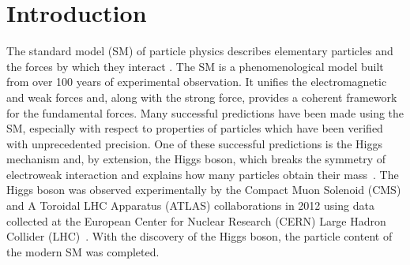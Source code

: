 \chapter{Introduction}
\label{chap:intro}

The standard model (SM) of particle physics describes elementary particles and the forces by which they interact \cite{glashow_1961,weinberg,Salam:1968rm}. The SM is a phenomenological model built from over 100 years of experimental observation. It unifies the electromagnetic and weak forces and, along with the strong force, provides a coherent framework for the fundamental forces. Many successful predictions have been made using the SM, especially with respect to properties of particles which have been verified with unprecedented precision. One of these successful predictions is the Higgs mechanism and, by extension, the Higgs boson, which breaks the symmetry of electroweak interaction and explains how many particles obtain their mass~\cite{englert,higgs,higgs_1964,guralnic,higgs_1966,kibble_1967}. The Higgs boson was observed experimentally by the Compact Muon Solenoid (CMS) and A Toroidal LHC Apparatus (ATLAS) collaborations in 2012 using data collected at the European Center for Nuclear Research (CERN) Large Hadron Collider (LHC)~\cite{atlas:2012_higgs,cms:2012_higgs}. With the discovery of the Higgs boson, the particle content of the modern SM was completed.

